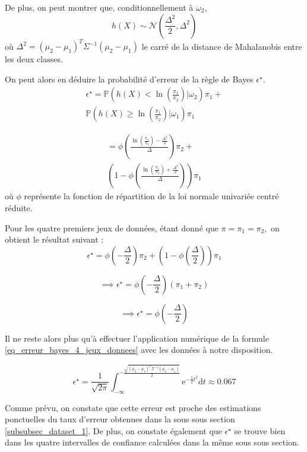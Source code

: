 \documentclass{article}
\begin{document}
\begin{multicols}{2}
De plus, on peut montrer que, conditionnellement à $\omega_2$,
\begin{equation}
\label{eq_hx_omega_2}
h(X) \sim \mathcal{N}\left( \frac{\Delta^2}{2}, \Delta^2 \right)
\end{equation}
où $\Delta^2 = (\mu_2 - \mu_1)^T \Sigma^{-1} (\mu_2 - \mu_1)$ le carré de la distance de Mahalanobis entre les deux classes.

On peut alors en déduire la probabilité d'erreur de la règle de Bayes $\epsilon^{\star}$.
\[
\begin{split}
\epsilon^{\star} = \mathbb{P}\left(h(X) < \ln \left(\frac{\pi_1}{\pi_2} \right) | \omega_2 \right) \pi_1 + \\ 
\mathbb{P}\left(h(X) \geq \ln \left(\frac{\pi_1}{\pi_2} \right) | \omega_1 \right) \pi_1
\end{split}
\]

\[
\begin{split}
= \phi \left( \frac{\ln(\frac{\pi_1}{\pi_2}) - \frac{\Delta^2}{2}}{\Delta} \right) \pi_2 + \\ 
\left( 1 - \phi \left( \frac{ \ln(\frac{\pi_1}{\pi_2}) + \frac{\Delta^2}{2}}{\Delta} \right) \right) \pi_1
\end{split}
\]
où $\phi$ représente la fonction de répartition de la loi normale univariée centré réduite.

Pour les quatre premiers jeux de données, étant donné que $\pi = \pi_1 = \pi_2,$ on obtient le résultat suivant :
\[
\epsilon^{\star} = \phi \left( - \frac{\Delta}{2} \right) \pi_2 + 
\left( 1 - \phi \left( \frac{\Delta}{2} \right) \right) \pi_1
\]

\[
\implies \epsilon^{\star} = \phi \left( - \frac{\Delta}{2} \right) (\pi_1 + \pi_2)
\]

\begin{equation}
\label{eq_erreur_bayes_4_jeux_donnees}
\implies  \epsilon^{\star} = \phi \left( - \frac{\Delta}{2} \right)
\end{equation}


Il ne reste alors plus qu'à effectuer l'application numérique de la formule \ref{eq_erreur_bayes_4_jeux_donnees} avec les données à notre disposition. 

\[
\epsilon^{\star} = \frac{1}{\sqrt{2 \pi} } \int_{-\infty}^{ - \frac{\sqrt{(\mu_2 - \mu_1)^T \Sigma^{-1} (\mu_2 - \mu_1)}}{2} } \mathrm{e}^{-\frac 12 t^2} \mathrm{d}t \approx 0.067
\]

Comme prévu, on constate que cette erreur est proche des estimations ponctuelles du taux d'erreur obtenues dans la sous sous section \ref{subsubsec_dataset_1}. De plus, on constate également que $\epsilon^{\star}$ se trouve bien dans les quatre intervalles de confiance calculées dans la même sous sous section. 
\\ \\ \\ \\ \\ \\


\end{multicols}
\end{document}
